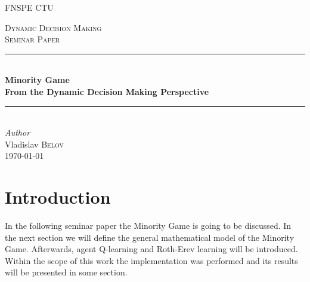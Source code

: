 \documentclass[12pt,american,czech]{article}
\begin{document}
\def\documentdate{...}


\begin{titlepage} %
	\newcommand{\HRule}{\rule{\linewidth}{0.5mm}} %
	\center %
	
	\textsc{\LARGE FNSPE CTU}\\[1.5cm] %
	\vfill
	
	\textsc{\Large Dynamic Decision Making}\\[0.5cm] %
	\textsc{\large Seminar Paper}\\[0.5cm] %
	\HRule\\[0.4cm]
	{\huge\bfseries Minority Game}\\
	{\LARGE\bfseries From the Dynamic Decision Making Perspective}\\[0.4cm] %
	\HRule\\[1.5cm]
	{\large\textit{Author}}\\
	Vladislav \textsc{Belov}\\
	\vfill\vfill\vfill\vfill\vfill\vfill\vfill %
	{\large\today} %
	
	
%	
	
	\vfill %
	
\end{titlepage}


\section{Introduction}\label{sec:introduction}

In the following seminar paper the Minority Game is going to be discussed. In the next section we will define the general mathematical model of the Minority Game. Afterwards, agent Q-learning and Roth-Erev learning will be introduced. Within the scope of this work the implementation was performed and its results will be presented in some section.
\end{document}
